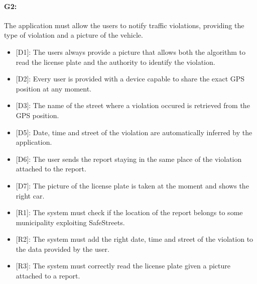 \documentclass[12pt,a4paper]{report}
\begin{document}
			\paragraph {G2:} The application must allow the users to notify traffic violations, providing the type of violation and a picture of the vehicle.
			\begin{itemize}
				\item{[D1]:} The users always provide a picture that allows both the algorithm to read the license plate and the authority to identify the violation.
				\item{[D2]:} Every user is provided with a device capable to share the exact GPS position at any moment.
				\item{[D3]:} The name of the street where a violation occured is retrieved from the GPS position.
				\item{[D5]:} Date, time and street of the violation are automatically inferred by the application.
				\item{[D6]:} The user sends the report staying in the same place of the violation attached to the report.
		 		\item{[D7]:} The picture of the license plate is taken at the moment and shows the right car.
			\end{itemize}
			\begin{itemize}
				\item{[R1]:} The system must check if the location of the report belongs to some municipality exploiting SafeStreets.
				\item{[R2]:} The system must add the right date, time and street of the violation to the data provided by the user.
				\item{[R3]:} The system must correctly read the license plate given a picture attached to a report.
			\end{itemize}
\end{document}
